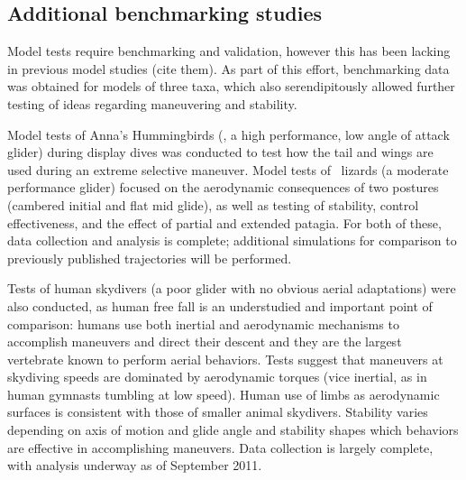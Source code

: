 \subsection{Additional benchmarking studies}
Model tests require benchmarking and validation, however this has been lacking in previous model studies (cite them).  As part of this effort, benchmarking data was obtained for models of three taxa, which also serendipitously allowed further testing of ideas regarding maneuvering and stability.  

Model tests of Anna's Hummingbirds (\Calypteanna, a high performance, low angle of attack glider) during display dives was conducted to test how the tail and wings are used during an extreme selective maneuver.  Model tests of \Draco\ lizards (a moderate performance glider) focused on the aerodynamic consequences of two postures (cambered initial and flat mid glide), as well as testing of stability, control effectiveness, and the effect of partial and extended patagia.  For both of these, data collection and analysis is complete; additional simulations for comparison to previously published trajectories will be performed.

Tests of human skydivers (a poor glider with no obvious aerial adaptations) were also conducted, as human free fall is an understudied and important point of comparison: humans use both inertial and aerodynamic mechanisms to accomplish maneuvers and direct their descent and they are the largest vertebrate known to perform aerial behaviors.  Tests suggest that maneuvers at skydiving speeds are dominated by aerodynamic torques (vice inertial, as in human gymnasts tumbling at low speed).  Human use of limbs as aerodynamic surfaces is consistent with those of smaller animal skydivers.  Stability varies depending on axis of motion and glide angle and stability shapes which behaviors are effective in accomplishing maneuvers. Data collection is largely complete, with analysis underway as of September 2011. 

